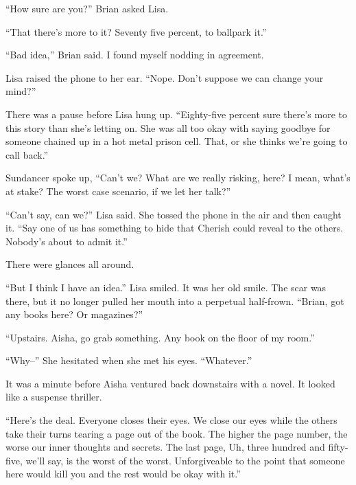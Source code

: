 ``How sure are you?'' Brian asked Lisa.



``That there's more to it?  Seventy five percent, to ballpark it.''



``Bad idea,'' Brian said.  I found myself nodding in agreement.



Lisa raised the phone to her ear.  ``Nope.  Don't suppose we can change your mind?''



There was a pause before Lisa hung up.  ``Eighty-five percent sure there's more to this story than she's letting on.  She was all too okay with saying goodbye for someone chained up in a hot metal prison cell.  That, or she thinks we're going to call back.''



Sundancer spoke up, ``Can't we?  What are we really risking, here?  I mean, what's at stake?  The worst case scenario, if we let her talk?''



``Can't say, can we?'' Lisa said.  She tossed the phone in the air and then caught it.  ``Say one of us has something to hide that Cherish could reveal to the others.  Nobody's about to admit it.''



There were glances all around.



``But I think I have an idea.''  Lisa smiled.  It was her old smile.  The scar was there, but it no longer pulled her mouth into a perpetual half-frown.  ``Brian, got any books here?  Or magazines?''



``Upstairs.  Aisha, go grab something.  Any book on the floor of my room.''



``Why--''  She hesitated when she met his eyes.  ``Whatever.''



It was a minute before Aisha ventured back downstairs with a novel.  It looked like a suspense thriller.



``Here's the deal.  Everyone closes their eyes.  We close our eyes while the others take their turns tearing a page out of the book.  The higher the page number, the worse our inner thoughts and secrets.  The last page, Uh, three hundred and fifty-five, we'll say, is the worst of the worst.  Unforgiveable to the point that someone here would kill you and the rest would be okay with it.''



